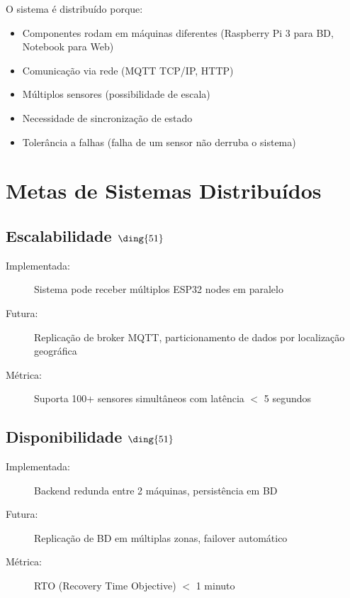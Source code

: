 \documentclass[12pt,a4paper,oneside]{report}
\newcommand{\checkmark}{\text{\ding{51}}}
\begin{document}
O sistema é distribuído porque:

\begin{itemize}
    \item Componentes rodam em máquinas diferentes (Raspberry Pi 3 para BD, Notebook para Web)
    \item Comunicação via rede (MQTT TCP/IP, HTTP)
    \item Múltiplos sensores (possibilidade de escala)
    \item Necessidade de sincronização de estado
    \item Tolerância a falhas (falha de um sensor não derruba o sistema)
\end{itemize}

\chapter{Metas de Sistemas Distribuídos}

\section{Escalabilidade $\checkmark$}

\begin{description}
    \item[Implementada:] Sistema pode receber múltiplos ESP32 nodes em paralelo
    \item[Futura:] Replicação de broker MQTT, particionamento de dados por localização geográfica
    \item[Métrica:] Suporta 100+ sensores simultâneos com latência $<$ 5 segundos
\end{description}

\section{Disponibilidade $\checkmark$}

\begin{description}
    \item[Implementada:] Backend redunda entre 2 máquinas, persistência em BD
    \item[Futura:] Replicação de BD em múltiplas zonas, failover automático
    \item[Métrica:] RTO (Recovery Time Objective) $<$ 1 minuto
\end{description}
\end{document}
